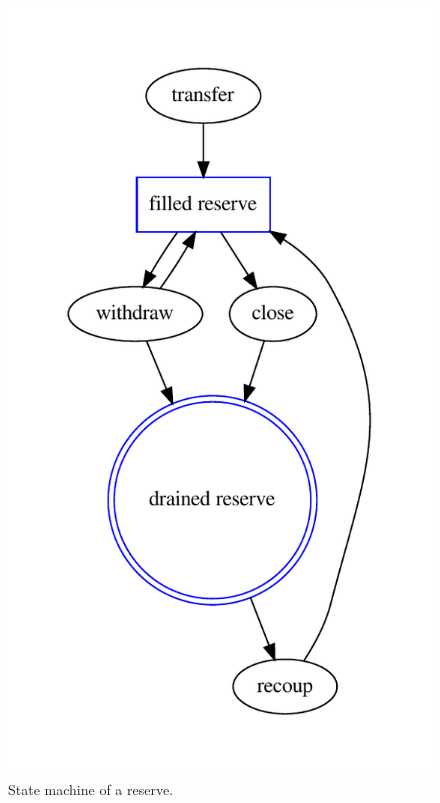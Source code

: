 \begin{figure}
  \begin{center}
    \includegraphics{taler/reserve.pdf}
  \end{center}
  \caption{State machine of a reserve.}
  \label{fig:reserve:states}
\end{figure}

